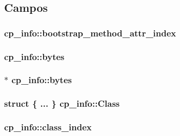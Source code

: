 \subsection{Campos}
\subsubsection[{\texorpdfstring{bootstrap\+\_\+method\+\_\+attr\+\_\+index}{bootstrap_method_attr_index}}]{ cp\+\_\+info\+::bootstrap\+\_\+method\+\_\+attr\+\_\+index}\hypertarget{structcp__info_abad11f89efc244065e72ec811f9dc929}{}\label{structcp__info_abad11f89efc244065e72ec811f9dc929}
\subsubsection[{\texorpdfstring{bytes}{bytes}}]{ cp\+\_\+info\+::bytes}\hypertarget{structcp__info_a4dcce18f4a19e8112079dc11dc2f5386}{}\label{structcp__info_a4dcce18f4a19e8112079dc11dc2f5386}
\subsubsection[{\texorpdfstring{bytes}{bytes}}]{$\ast$ cp\+\_\+info\+::bytes}\hypertarget{structcp__info_a30f97eda54e30a923a217520316e9301}{}\label{structcp__info_a30f97eda54e30a923a217520316e9301}
\subsubsection[{\texorpdfstring{Class}{Class}}]{\setlength{\rightskip}{0pt plus 5cm}struct \{ ... \}   cp\+\_\+info\+::\+Class}\hypertarget{structcp__info_aa2cc42e313a1550a5f5e8c0d7ffc58ee}{}\label{structcp__info_aa2cc42e313a1550a5f5e8c0d7ffc58ee}
\subsubsection[{\texorpdfstring{class\+\_\+index}{class_index}}]{ cp\+\_\+info\+::class\+\_\+index}\hypertarget{structcp__info_a1c7c3f3e2f9a620669b5f5cc51249ef8}{}\label{structcp__info_a1c7c3f3e2f9a620669b5f5cc51249ef8}
